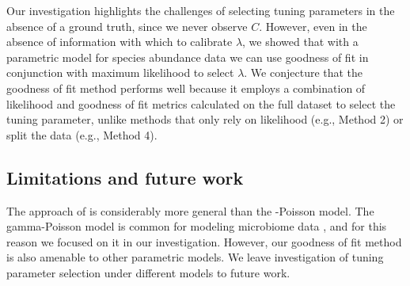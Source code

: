 \documentclass[12pt]{article}
\newcommand{\lambdagrid}{\lambda^{\text{grid}}}
\begin{document}
Our investigation highlights the challenges of selecting tuning parameters in the absence of a ground truth, since we never observe $C$. However, even in the absence of information with which to calibrate $\lambda$, we showed that
with a parametric model for species abundance data we can use goodness of fit in conjunction with maximum likelihood to select $\lambda$.
We conjecture that the goodness of fit method performs well because it employs a combination of likelihood and goodness of fit metrics calculated on the full dataset to select the tuning parameter, unlike methods that only rely on likelihood (e.g., Method 2) or split the data (e.g., Method 4).



\subsection{Limitations and future work}

The approach of \citet{wang_2005} is considerably more general than the
-Poisson model.  The gamma-Poisson model is common for modeling microbiome data \citep{deseq2,holmes2018modern}, and for this reason we focused on it in our investigation. However, our goodness of fit method is also amenable to other parametric models. We leave investigation of tuning parameter selection under different models to future work.
\end{document}
